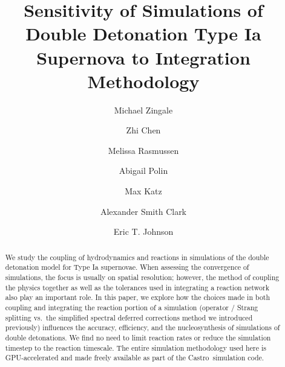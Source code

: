 \documentclass[preprint,linenumbers]{aastex631}
\newcommand{\castro}{{\sf Castro}}
\begin{document}
\title{Sensitivity of Simulations of Double Detonation Type
Ia Supernova to Integration Methodology}


\author[0000-0001-8401-030X]{Michael Zingale}

\author[0000-0002-2839-107X]{Zhi Chen}


\author[0000-0002-0297-0313]{Melissa Rasmussen}

\author[0000-0002-1633-6495]{Abigail Polin}

\author[0000-0003-0439-4556]{Max Katz}


\author[0000-0001-5961-1680]{Alexander Smith Clark}

\author[0000-0003-3603-6868]{Eric T. Johnson}



\begin{abstract}
We study the coupling of hydrodynamics and reactions in simulations of the double detonation model for Type Ia supernovae.  When assessing the
convergence of simulations, the focus is usually on spatial resolution; 
however, the method of coupling the physics together as well as the
tolerances used in integrating a reaction network also play an important role.
In this paper, we explore how the choices made in both coupling and integrating the reaction
portion of a simulation (operator / Strang splitting vs.\ the simplified spectral deferred corrections method we introduced previously) influences the accuracy, efficiency, and the nucleosynthesis
of simulations of double detonations.
We find no need to limit reaction rates or reduce the
simulation timestep to the reaction timescale.  The entire simulation
methodology used here is GPU-accelerated and made freely available as part of the \castro\ simulation
code.
\end{abstract}
\end{document}
